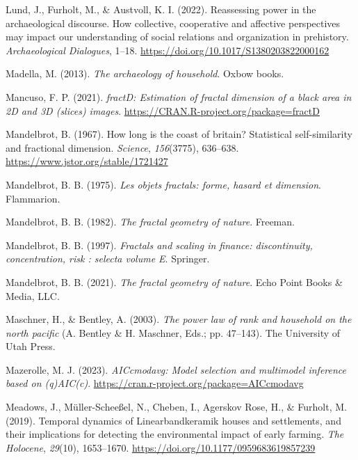 \documentclass[
  12pt,
]{book}
\newlength{\cslhangindent}
\newlength{\cslentryspacingunit} %
\newenvironment{CSLReferences}[2] %
 {%
  \setlength{\parindent}{0pt}
  \ifodd #1
  \let\oldpar\par
  \def\par{\hangindent=\cslhangindent\oldpar}
  \fi
  \setlength{\parskip}{#2\cslentryspacingunit}
 }%
 {}
\begin{document}
\begin{CSLReferences}{1}{0}
\leavevmode{}%
Lund, J., Furholt, M., \& Austvoll, K. I. (2022). Reassessing power in the archaeological discourse. How collective, cooperative and affective perspectives may impact our understanding of social relations and organization in prehistory. \emph{Archaeological Dialogues}, 1--18. \url{https://doi.org/10.1017/S1380203822000162}

\leavevmode{}%
Madella, M. (2013). \emph{The archaeology of household}. Oxbow books.

\leavevmode{}%
Mancuso, F. P. (2021). \emph{fractD: Estimation of fractal dimension of a black area in 2D and 3D (slices) images}. \url{https://CRAN.R-project.org/package=fractD}

\leavevmode{}%
Mandelbrot, B. (1967). How long is the coast of britain? Statistical self-similarity and fractional dimension. \emph{Science}, \emph{156}(3775), 636--638. \url{https://www.jstor.org/stable/1721427}

\leavevmode{}%
Mandelbrot, B. B. (1975). \emph{Les objets fractals: forme, hasard et dimension}. Flammarion.

\leavevmode{}%
Mandelbrot, B. B. (1982). \emph{The fractal geometry of nature}. Freeman.

\leavevmode{}%
Mandelbrot, B. B. (1997). \emph{Fractals and scaling in finance: discontinuity, concentration, risk : selecta volume E}. Springer.

\leavevmode{}%
Mandelbrot, B. B. (2021). \emph{The fractal geometry of nature}. Echo Point Books \& Media, LLC.

\leavevmode{}%
Maschner, H., \& Bentley, A. (2003). \emph{The power law of rank and household on the north pacific} (A. Bentley \& H. Maschner, Eds.; pp. 47--143). The University of Utah Press.

\leavevmode{}%
Mazerolle, M. J. (2023). \emph{AICcmodavg: Model selection and multimodel inference based on (q)AIC(c)}. \url{https://cran.r-project.org/package=AICcmodavg}

\leavevmode{}%
Meadows, J., Müller-Scheeßel, N., Cheben, I., Agerskov Rose, H., \& Furholt, M. (2019). Temporal dynamics of Linearbandkeramik houses and settlements, and their implications for detecting the environmental impact of early farming. \emph{The Holocene}, \emph{29}(10), 1653--1670. \url{https://doi.org/10.1177/0959683619857239}


\end{CSLReferences}
\end{document}
